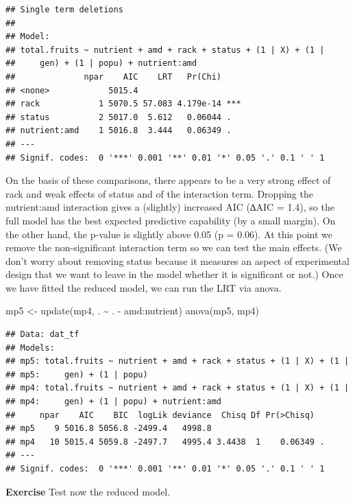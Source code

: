\documentclass[
  12pt,
]{book}
\newenvironment{Shaded}{\begin{snugshade}}{\end{snugshade}}
\newcommand{\FunctionTok}[1]{\textcolor[rgb]{0.00,0.00,0.00}{#1}}
\newcommand{\NormalTok}[1]{#1}
\newcommand{\OtherTok}[1]{\textcolor[rgb]{0.56,0.35,0.01}{#1}}
\newcommand{\SpecialCharTok}[1]{\textcolor[rgb]{0.00,0.00,0.00}{#1}}
\begin{document}
\begin{verbatim}
## Single term deletions
## 
## Model:
## total.fruits ~ nutrient + amd + rack + status + (1 | X) + (1 | 
##     gen) + (1 | popu) + nutrient:amd
##              npar    AIC    LRT   Pr(Chi)    
## <none>            5015.4                     
## rack            1 5070.5 57.083 4.179e-14 ***
## status          2 5017.0  5.612   0.06044 .  
## nutrient:amd    1 5016.8  3.444   0.06349 .  
## ---
## Signif. codes:  0 '***' 0.001 '**' 0.01 '*' 0.05 '.' 0.1 ' ' 1
\end{verbatim}

On the basis of these comparisons, there appears to be a very strong effect of rack and weak effects of status and of the interaction term. Dropping the nutrient:amd interaction gives a (slightly) increased AIC (∆AIC = 1.4), so the full model has the best expected predictive capability (by a small margin). On the other hand, the p-value is slightly above 0.05 (p = 0.06). At this point we remove the non-significant interaction term so we can test the main effects. (We don't worry about removing status because it measures an aspect of experimental design that we want to leave in the model whether it is significant or not.) Once we have fitted the reduced model, we can run the LRT via anova.

\begin{Shaded}
\begin{Highlighting}[]
\NormalTok{mp5 }\OtherTok{\textless{}{-}} \FunctionTok{update}\NormalTok{(mp4, . }\SpecialCharTok{\textasciitilde{}}\NormalTok{ . }\SpecialCharTok{{-}}\NormalTok{ amd}\SpecialCharTok{:}\NormalTok{nutrient)}
\FunctionTok{anova}\NormalTok{(mp5, mp4)}
\end{Highlighting}
\end{Shaded}

\begin{verbatim}
## Data: dat_tf
## Models:
## mp5: total.fruits ~ nutrient + amd + rack + status + (1 | X) + (1 | 
## mp5:     gen) + (1 | popu)
## mp4: total.fruits ~ nutrient + amd + rack + status + (1 | X) + (1 | 
## mp4:     gen) + (1 | popu) + nutrient:amd
##     npar    AIC    BIC  logLik deviance  Chisq Df Pr(>Chisq)  
## mp5    9 5016.8 5056.8 -2499.4   4998.8                       
## mp4   10 5015.4 5059.8 -2497.7   4995.4 3.4438  1    0.06349 .
## ---
## Signif. codes:  0 '***' 0.001 '**' 0.01 '*' 0.05 '.' 0.1 ' ' 1
\end{verbatim}

\textbf{Exercise}
Test now the reduced model.
\end{document}

